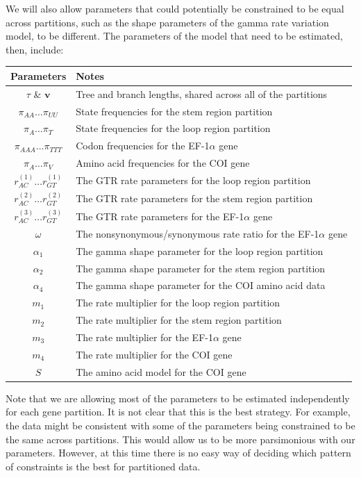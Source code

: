 \documentclass{svmult}
\begin{document}
We will also allow parameters that could potentially be constrained to be equal across partitions,
such as the shape parameters of the gamma rate variation model, to be different. The parameters of
the model that need to be estimated, then, include:
\begin{center}
\begin{tabular}{cl}
Parameters & Notes \\ \hline
 $\tau$ \& ${\mathbf v}$ & Tree and branch lengths, shared across all of the partitions \\
 $\pi_{AA} \ldots \pi_{UU}$ & State frequencies for the stem region partition \\
 $\pi_{A} \ldots \pi_{T}$ & State frequencies for the loop region partition \\
 $\pi_{AAA} \ldots \pi_{TTT}$ & Codon frequencies for the EF-1$\alpha$ gene \\
 $\pi_{A} \ldots \pi_{V}$ & Amino acid frequencies for the COI gene \\
 $r^{(1)}_{AC} \ldots r^{(1)}_{GT}$ & The GTR rate parameters for the loop region partition\\
 $r^{(2)}_{AC} \ldots r^{(2)}_{GT}$ & The GTR rate parameters for the stem region partition\\
 $r^{(3)}_{AC} \ldots r^{(3)}_{GT}$ & The GTR rate parameters for the EF-1$\alpha$ gene \\
 $\omega$ & The nonsynonymous/synonymous rate ratio for the EF-1$\alpha$ gene\\
 $\alpha_1$ & The gamma shape parameter for the loop region partition \\
 $\alpha_2$ & The gamma shape parameter for the stem region partition \\
 $\alpha_4$ & The gamma shape parameter for the COI amino acid data\\
 $m_1$ & The rate multiplier for the loop region partition \\
 $m_2$ & The rate multiplier for the stem region partition \\
 $m_3$ & The rate multiplier for the EF-1$\alpha$ gene \\
 $m_4$ & The rate multiplier for the COI gene \\
 $S$ & The amino acid model for the COI gene \\
\end{tabular}
\end{center}
Note that we are allowing most of the parameters to be estimated independently for each gene
partition. It is not clear that this is the best strategy.  For example, the data might be
consistent with some of the parameters being constrained to be the same across partitions. This
would allow us to be more parsimonious with our parameters. However, at this time there is no easy
way of deciding which pattern of constraints is the best for partitioned data.
\end{document}

